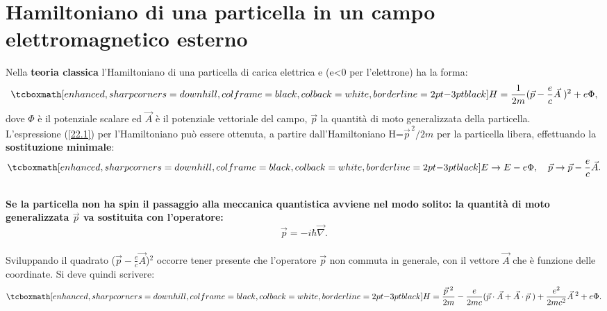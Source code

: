 \chapter[Particella in campo elettromagnetico]{Hamiltoniano di una particella in un campo elettromagnetico esterno}
Nella \textbf{teoria classica} l'Hamiltoniano di una particella di carica elettrica e (e<0 per l'elettrone) ha la forma:
	\begin{equation}
		\tcboxmath[enhanced, sharp corners=downhill, colframe=black, colback=white, borderline={2pt}{-3pt}{black}]{
			H=\frac{1}{2m}(\vec{p}-\frac{e}{c}\vec{A}\;)^{2}+e\Phi ,
			}
	\label{22.1}
	\end{equation}
dove $\Phi$ è il potenziale scalare ed $\vec{A}$ è il potenziale vettoriale del campo, $\vec{p}$ la quantità di moto generalizzata della particella. \\

L'espressione (\ref{22.1}) per l'Hamiltoniano può essere ottenuta, a partire dall'Hamiltoniano H=$\vec{p}^{\,2}/2m$ per la particella libera, effettuando la \textbf{sostituzione minimale}:
	\begin{equation}
		\tcboxmath[enhanced, sharp corners=downhill, colframe=black, colback=white, borderline={2pt}{-3pt}{black}]{
			E\rightarrow E-e\Phi,\quad \vec{p}\rightarrow \vec{p}-\frac{e}{c}\vec{A} .
			}
	\end{equation}\\
	
\textbf{Se la particella non ha spin il passaggio alla meccanica quantistica avviene nel modo solito: la quantità di moto generalizzata $\vec{p}$ va sostituita con l'operatore:}
	\begin{equation}
		\vec{p}=-i\hbar \vec{\nabla} .
	\end{equation}\\

Sviluppando il quadrato ($\vec{p}-\frac{e}{c}\vec{A}$)$^{2}$ occorre tener presente che l'operatore $\vec{p}$ non commuta in generale, con il vettore $\vec{A}$ che è funzione delle coordinate. Si deve quindi scrivere:
	\begin{equation}
		\tcboxmath[enhanced, sharp corners=downhill, colframe=black, colback=white, borderline={2pt}{-3pt}{black}]{
			H= \frac{\vec{p}^{\;2}}{2m}-\frac{e}{2mc}(\vec{p}\cdot\vec{A}+\vec{A}\cdot\vec{p}\;)+\frac{e^{2}}{2mc^{2}}\vec{A}^{\;2}+e\Phi .
			}
	\label{22.4}
	\end{equation}\\
	
